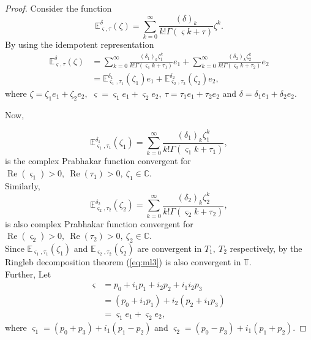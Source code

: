 \documentclass[a4paper,12pt]{article}
\theoremstyle{remark}
\begin{document}
\begin{proof}
Consider the function
\begin{equation}\label{eq:ml3}
\mathbb{E}_{ \varsigma,\tau}^\delta(\zeta)=\sum_{k=0}^{\infty}\frac{(\delta)_k}{k!\Gamma( \varsigma k+\tau )}\zeta^k.  \end{equation}
By using the idempotent representation
\begin{equation}\label{eq: bc ml three para}
\begin{split}
\mathbb{E}_{ \varsigma,\tau}^\delta(\zeta)&=\sum_{k=0}^{\infty}\frac{(\delta_1)_k\zeta_1^k}{k!\Gamma( \varsigma_1 k+\tau_1 )}e_1+\sum_{k=0}^{\infty}\frac{(\delta_2)_k \zeta_2^k}{k!\Gamma( \varsigma_2 k+\tau_2 )}e_2\\
&=\mathbb{E}_{ \varsigma_1,\tau_1}^{\delta_1}(\zeta_1)e_1+\mathbb{E}_{ \varsigma_2,\tau_2}^{\delta_2}(\zeta_2)e_2,
\end{split}
\end{equation}
where $\zeta=\zeta_1 e_1+\zeta_2e_2,$  $ \varsigma= \varsigma_1e_1+ \varsigma_2 e_2,~ \tau=\tau_1e_1+\tau_2e_2$ and $\delta=\delta_1e_1+\delta_2e_2.$
		
\noindent Now,		
		
\begin{equation}
\mathbb{E}_{ \varsigma_1,\tau_1}^{\delta_1}(\zeta_1)=\sum_{k=0}^{\infty}\frac{({\delta_1})_k\zeta_1^k}{k!\Gamma( \varsigma_1 k+\tau_1 )},
\end{equation}
is the  complex Prabhakar function  convergent for $\operatorname{Re}( \varsigma_1)>0 ,~\operatorname{Re}(\tau_1)>0,~\zeta_1 \in \mathbb{C}.$\\
Similarly,
\begin{equation}\label{eq cml1}
\mathbb{E}_{ \varsigma_2,\tau_2}^{\delta_2}(\zeta_2)=\sum_{k=0}^{\infty}\frac{({\delta_2})_k \zeta_2^k}{k!\Gamma( \varsigma_2 k+\tau_2 )},
\end{equation}
is also complex Prabhakar function  convergent for $\operatorname{Re}( \varsigma_2)>0,~\operatorname{Re}(\tau_2)>0 ,~\zeta_2\in \mathbb{C}.$\\
Since $ \mathbb{E}_{ \varsigma_1,\tau_1}(\zeta_1) $ and $\mathbb{E}_{ \varsigma_2,\tau_2}(\zeta_2)$ are convergent in $T_1,~T_2$ respectively, by the  Ringleb decomposition theorem  (\ref{eq:ml3}) is also convergent in $\mathbb{T}.$\\
		
\noindent Further, Let
\begin{equation}
\begin{split}
 \varsigma&= p_0+i_1p_1+ i_2p_2+i_1i_2p_3\\
&=(p_0+i_1p_1) +i_2( p_2+i_1p_3)\\
&= \varsigma_1e_1+ \varsigma_2e_2,
\end{split}
\end{equation}
where $ \varsigma_1= (p_0+p_3) +i_1(p_1-p_2)$ and $ \varsigma_2= (p_0-p_3) +i_1(p_1+p_2).$
		

\end{proof}
\end{document}
